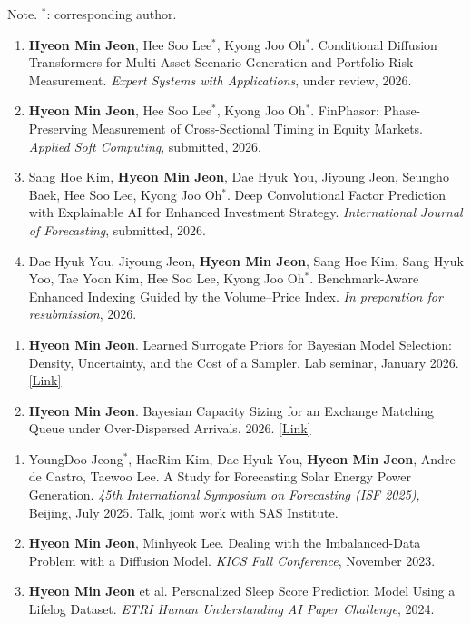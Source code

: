 \documentclass[11pt]{article}
\makeatletter
\newcommand{\cvsection}[1]{\par\addvspace{14pt}{\large\scshape\color{accent}#1\strut\par}\nopagebreak\vskip 5.9pt\relax\@afterheading}
\newcommand{\cvsubsection}[1]{\par\vspace{3.9pt}{\scshape #1\par}\nopagebreak\vskip 8pt\relax\@afterheading}
\newcommand{\me}{\textbf{Hyeon Min Jeon}}
\newcommand{\corr}{$^{*}$}
\makeatother
\begin{document}
\cvsection{Publications and Working Papers}
Note. \corr: corresponding author.\par
\cvsubsection{Journal Manuscripts}
\begin{enumerate}
\item \me, Hee Soo Lee\corr, Kyong Joo Oh\corr. Conditional Diffusion Transformers for Multi-Asset Scenario Generation and Portfolio Risk Measurement. \textit{Expert Systems with Applications}, under review, 2026.
\item \me, Hee Soo Lee\corr, Kyong Joo Oh\corr. FinPhasor: Phase-Preserving Measurement of Cross-Sectional Timing in Equity Markets. \textit{Applied Soft Computing}, submitted, 2026.
\item Sang Hoe Kim, \me, Dae Hyuk You, Jiyoung Jeon, Seungho Baek, Hee Soo Lee, Kyong Joo Oh\corr. Deep Convolutional Factor Prediction with Explainable AI for Enhanced Investment Strategy. \textit{International Journal of Forecasting}, submitted, 2026.
\item Dae Hyuk You, Jiyoung Jeon, \me, Sang Hoe Kim, Sang Hyuk Yoo, Tae Yoon Kim, Hee Soo Lee, Kyong Joo Oh\corr. Benchmark-Aware Enhanced Indexing Guided by the Volume--Price Index. \textit{In preparation for resubmission}, 2026.
\end{enumerate}
\cvsubsection{Working Papers}
\begin{enumerate}[resume]
\item \me. Learned Surrogate Priors for Bayesian Model Selection: Density, Uncertainty, and the Cost of a Sampler. Lab seminar, January 2026. \href{https://hy-mdl.github.io/research/model-uncertainty-priors/}{[Link]}
\item \me. Bayesian Capacity Sizing for an Exchange Matching Queue under Over-Dispersed Arrivals. 2026. \href{https://hy-mdl.github.io/projects/exchange-queueing/}{[Link]}
\end{enumerate}
\cvsubsection{Conference Presentations}
\begin{enumerate}[resume]
\item YoungDoo Jeong\corr, HaeRim Kim, Dae Hyuk You, \me, Andre de Castro, Taewoo Lee. A Study for Forecasting Solar Energy Power Generation. \textit{45th International Symposium on Forecasting (ISF 2025)}, Beijing, July 2025. Talk, joint work with SAS Institute.
\item \me, Minhyeok Lee. Dealing with the Imbalanced-Data Problem with a Diffusion Model. \textit{KICS Fall Conference}, November 2023.
\item \me{} et al. Personalized Sleep Score Prediction Model Using a Lifelog Dataset. \textit{ETRI Human Understanding AI Paper Challenge}, 2024.
\end{enumerate}
\end{document}
